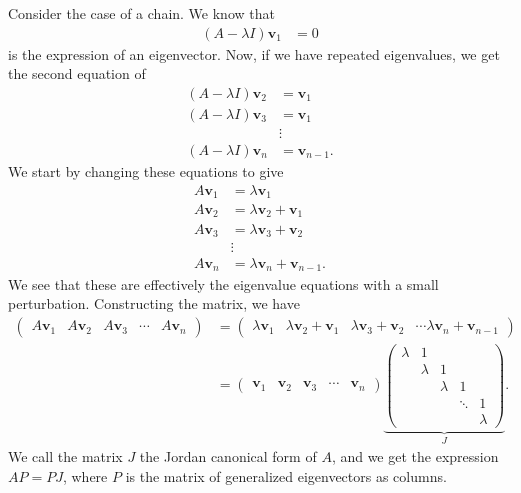\documentclass[10pt]{mypackage}
\begin{document}
\begin{example}
  Consider the case of a chain. We know that
  \begin{align*}
    \left( A -\lambda I \right)\mathbf{v}_1 &= 0
  \end{align*}
  is the expression of an eigenvector. Now, if we have repeated eigenvalues, we get the second equation of
  \begin{align*}
    \left( A - \lambda I \right)\mathbf{v}_2 &= \mathbf{ v }_1\\
    \left( A - \lambda I \right)\mathbf{v}_3 &= \mathbf{v}_1\\
                                             &\vdots\\
    \left( A - \lambda I \right)\mathbf{v}_{n} &= \mathbf{v}_{n-1}.
  \end{align*}
  We start by changing these equations to give
  \begin{align*}
    A\mathbf{v}_1 &= \lambda\mathbf{v}_1 \\
    A \mathbf{v}_2 &= \lambda \mathbf{v}_2 + \mathbf{v}_1\\
    A\mathbf{v}_3 &= \lambda \mathbf{v}_3 + \mathbf{v}_2\\
                  &\vdots\\
    A\mathbf{v}_n &= \lambda \mathbf{v}_n + \mathbf{v}_{n-1}.
  \end{align*}
  We see that these are effectively the eigenvalue equations with a small perturbation. Constructing the matrix, we have
  \begin{align*}
    \begin{pmatrix}A \mathbf{v}_1 & A\mathbf{v}_2 & A\mathbf{v}_3 & \cdots & A\mathbf{v}_n\end{pmatrix} &= \begin{pmatrix}\lambda \mathbf{v}_1 & \lambda \mathbf{v}_2 + \mathbf{v}_1 & \lambda \mathbf{v}_3 + \mathbf{v}_2 & \cdots \lambda \mathbf{v}_n + \mathbf{v}_{n-1}\end{pmatrix}\\
                                  &= \begin{pmatrix}\mathbf{v}_1 & \mathbf{v}_2 & \mathbf{v}_3 & \cdots & \mathbf{v}_n\end{pmatrix}  \underbrace{\begin{pmatrix} \lambda & 1 &  &  &  \\ & \lambda & 1 &  &  \\&  & \lambda & 1 &  \\ &  &  & \ddots & 1 \\&  &  &  & \lambda \end{pmatrix}}_{J}.
  \end{align*}
  We call the matrix $J$ the Jordan canonical form of $A$, and we get the expression $AP = PJ$, where $P$ is the matrix of generalized eigenvectors as columns.\newline


\end{example}
\end{document}
